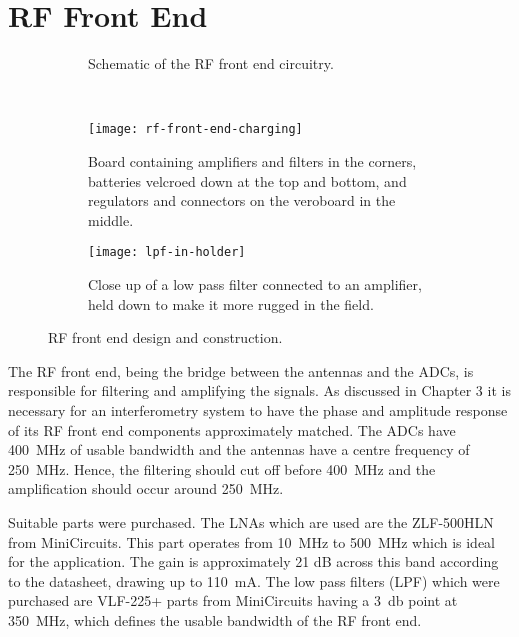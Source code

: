 \section{RF Front End}

\begin{figure}
  \centering
  \begin{subfigure}{\textwidth}
    \centering
    
    \caption{Schematic of the RF front end circuitry.}
  \end{subfigure}\\[1em]
  \begin{subfigure}{\textwidth}
    \centering
    \texttt{[image: rf-front-end-charging]}
    \caption{Board containing amplifiers and filters in the corners, batteries velcroed down at the top and bottom, and regulators and connectors on the veroboard in the middle.}
  \end{subfigure}
  \begin{subfigure}{\textwidth}
    \centering
    \texttt{[image: lpf-in-holder]}
    \caption{Close up of a low pass filter connected to an amplifier, held down to make it more rugged in the field.}
  \end{subfigure}
  \caption{RF front end design and construction.}
  \label{fig:rf-front-end:circuit-board}
\end{figure}

The RF front end, being the bridge between the antennas and the ADCs, is responsible for filtering and amplifying the signals. As discussed in Chapter 3 it is necessary for an interferometry system to have the phase and amplitude response of its RF front end components approximately matched.
The ADCs have \SI{400}{\mega\hertz} of usable bandwidth and the antennas have a centre frequency of \SI{250}{\mega\hertz}. Hence, the filtering should cut off before \SI{400}{\mega\hertz} and the amplification should occur around \SI{250}{\mega\hertz}. 

Suitable parts were purchased. The LNAs which are used are the ZLF-500HLN from MiniCircuits. This part operates from \SI{10}{\mega\hertz} to \SI{500}{\mega\hertz} which is ideal for the application. The gain is approximately 21 dB across this band according to the datasheet, drawing up to \SI{110}{\milli\ampere}.  The low pass filters (LPF) which were purchased are VLF-225+ parts from MiniCircuits having a \SI{3}{\decibel} point at \SI{350}{\mega\hertz}, which defines the usable bandwidth of the RF front end.

